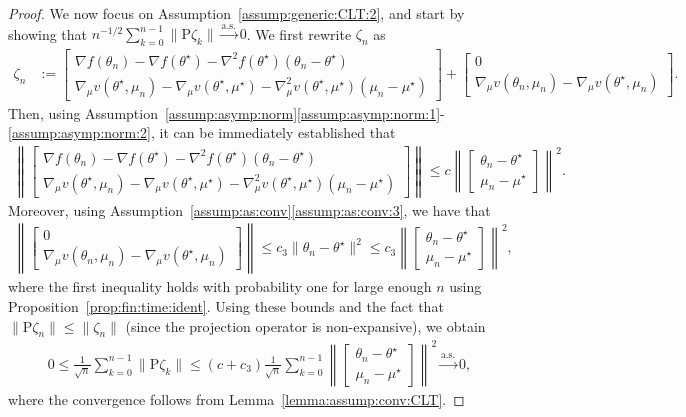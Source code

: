 \documentclass[11pt,a4paper]{article}
\theoremstyle{definition}
\begin{document}
\begin{proof}
We now focus on Assumption~\ref{assump:generic:CLT:2}, and start by showing that $n^{-1/2} \sum_{k=0}^{n-1} \|\text{P} \zeta_k\| \overset{\text{a.s.}}{\to} 0$. We first rewrite $\zeta_n$ as
\begin{align*}
    \zeta_n &:= \begin{bmatrix} \nabla {f}(\theta_n) - \nabla {f}(\theta^\star) - \nabla^2 {f}(\theta^\star)(\theta_n - \theta^\star) \\  \nabla_\mu v(\theta^\star,\mu_n) - \nabla_\mu v(\theta^\star,\mu^\star) - \nabla_\mu^2 v(\theta^\star,\mu^\star)(\mu_n - \mu^\star) \end{bmatrix} + \begin{bmatrix} 0 \\  \nabla_\mu v(\theta_n,\mu_n) - \nabla_\mu v(\theta^\star,\mu_n) \end{bmatrix}.
\end{align*}
Then, using Assumption~\ref{assump:asymp:norm}\ref{assump:asymp:norm:1}-\ref{assump:asymp:norm:2}, it can be immediately established that
\begin{align*}
    \left\| \begin{bmatrix} \nabla {f}(\theta_n) - \nabla {f}(\theta^\star) - \nabla^2 {f}(\theta^\star)(\theta_n - \theta^\star) \\  \nabla_\mu v(\theta^\star,\mu_n) - \nabla_\mu v(\theta^\star,\mu^\star) - \nabla_\mu^2 v(\theta^\star,\mu^\star)(\mu_n - \mu^\star) \end{bmatrix} \right\| \leq c \left\| \begin{bmatrix}
        \theta_n - \theta^\star \\ \mu_n - \mu^\star
    \end{bmatrix} \right\|^2.
\end{align*}
Moreover, using Assumption~\ref{assump:as:conv}\ref{assump:as:conv:3}, we have that
\begin{align*}
    \left\| \begin{bmatrix} 0 \\  \nabla_\mu v(\theta_n,\mu_n) - \nabla_\mu v(\theta^\star,\mu_n) \end{bmatrix} \right\| \leq c_3 \|\theta_n -\theta^\star \|^2 \leq c_3 \left\| \begin{bmatrix}
        \theta_n - \theta^\star \\ \mu_n - \mu^\star
    \end{bmatrix} \right\|^2,
\end{align*}
where the first inequality holds with probability one for large enough $n$ using Proposition~\ref{prop:fin:time:ident}. Using these bounds and the fact that $\|\text{P} \zeta_n\| \leq \|\zeta_n\|$ (since the projection operator is non-expansive), we obtain
\begin{align*}
    0 \leq \frac{1}{\sqrt{n}} \sum_{k=0}^{n-1} \|\text{P} \zeta_k\| \leq (c+c_3) \frac{1}{\sqrt{n}} \sum_{k=0}^{n-1} \left\| \begin{bmatrix}
        \theta_n - \theta^\star \\ \mu_n - \mu^\star
    \end{bmatrix} \right\|^2 \overset{\text{a.s.}}{\to} 0,
\end{align*}
where the convergence follows from Lemma~\ref{lemma:assump:conv:CLT}. 


\end{proof}
\end{document}
